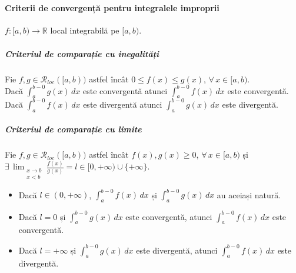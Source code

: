 \part{}
\subsection{Criterii de convergență pentru integralele improprii}
$f:[a,b) \rightarrow \mathbb{R}$ local integrabilă pe $[a,b)$.

\subsubsection{Criteriul de comparație cu inegalități}
Fie $f, g \in \mathcal{R}_{loc}([a,b))$ astfel încât $0 \leq f(x) \leq g(x)$, $\forall \, x \in [a,b)$. \\[5pt]
Dacă $\displaystyle\int_{a}^{b-0} g(x) \, dx$ este convergentă atunci $\displaystyle\int_{a}^{b-0} f(x) \, dx$ este convergentă. \\
Dacă $\displaystyle\int_{a}^{b-0} f(x) \, dx$ este divergentă atunci $\displaystyle\int_{a}^{b-0} g(x) \, dx$ este divergentă. \\

\subsubsection{Criteriul de comparație cu limite}
Fie $f, g \in \mathcal{R}_{loc}([a,b))$ astfel încât $f(x), g(x) \geq 0$, $\forall \, x \in [a,b)$ și
$\exists \, \displaystyle\lim_{\substack{x \rightarrow b \\ x < b}} \displaystyle\frac{f(x)}{g(x)} = l \in [0, +\infty) \cup \{ +\infty \}$.
\begin{itemize}
    \item Dacă $l \in (0, +\infty)$, $\displaystyle\int_{a}^{b-0} f(x) \, dx$ și $\displaystyle\int_{a}^{b-0} g(x) \, dx$ au aceiași natură.
    \item Dacă $l = 0$ și $\displaystyle\int_{a}^{b-0} g(x) \, dx$ este convergentă, atunci $\displaystyle\int_{a}^{b-0} f(x) \, dx$ este convergentă.
    \item Dacă $l = +\infty$ și $\displaystyle\int_{a}^{b-0} g(x) \, dx$ este divergentă, atunci $\displaystyle\int_{a}^{b-0} f(x) \, dx$ este divergentă.
\end{itemize}

